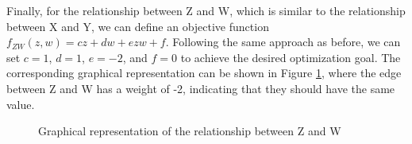 Finally, for the relationship between Z and W, which is similar to the relationship between X and Y, we can define an objective function $f_{ZW}(z, w) = cz+dw+ezw+f$. Following the same approach as before, we can set $c=1$, $d=1$, $e=-2$, and $f=0$ to achieve the desired optimization goal. The corresponding graphical representation can be shown in Figure \ref{fig:qubo_graph_6}, where the edge between Z and W has a weight of -2, indicating that they should have the same value.
\begin{figure}
    \centering
    \caption{Graphical representation of the relationship between Z and W}\label{fig:qubo_graph_6}
\end{figure}

